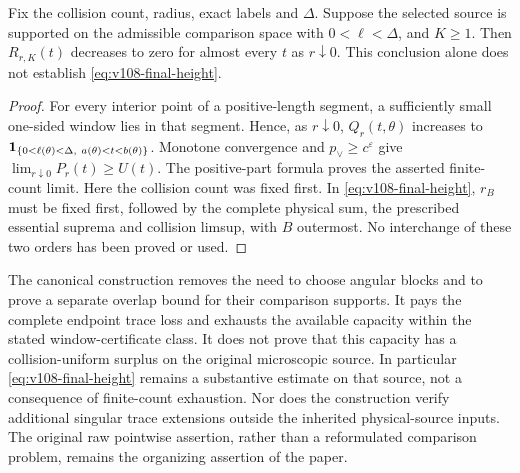 \begin{proposition}
\label{prop:v108-exhaustion}
Fix the collision count, radius, exact labels and $\Delta$.
Suppose the selected source is supported on the admissible
comparison space with $0<\ell<\Delta$, and $K\ge1$.
Then $R_{r,K}(t)$ decreases to zero for almost every $t$ as
$r\downarrow0$. This conclusion alone does not establish
\eqref{eq:v108-final-height}.
\end{proposition}
\begin{proof}
For every interior point of a positive-length segment, a sufficiently
small one-sided window lies in that segment. Hence, as $r\downarrow0$,
$Q_r(t,\theta)$ increases to
$\one_{\{0<\ell(\theta)<\Delta,\ a(\theta)<t<b(\theta)\}}$.
Monotone convergence and $p_\vee\ge c^\varepsilon$ give
$\lim_{r\downarrow0}P_r(t)\ge U(t)$.
The positive-part formula proves the asserted finite-count limit.
Here the collision count was fixed first. In
\eqref{eq:v108-final-height}, $r_B$ must be fixed first, followed by
the complete physical sum, the prescribed essential suprema and
collision limsup, with $B$ outermost. No interchange of these two
orders has been proved or used.
\end{proof}

The canonical construction removes the need to choose angular
blocks and to prove a separate overlap bound for their comparison
supports. It pays the complete endpoint trace loss and exhausts the
available capacity within the stated window-certificate class.
It does not prove that this capacity has a collision-uniform surplus
on the original microscopic source. In particular
\eqref{eq:v108-final-height} remains a substantive estimate on that
source, not a consequence of finite-count exhaustion. Nor does the
construction verify additional singular trace extensions outside
the inherited physical-source inputs. The original raw pointwise
assertion, rather than a reformulated comparison problem, remains
the organizing assertion of the paper.
